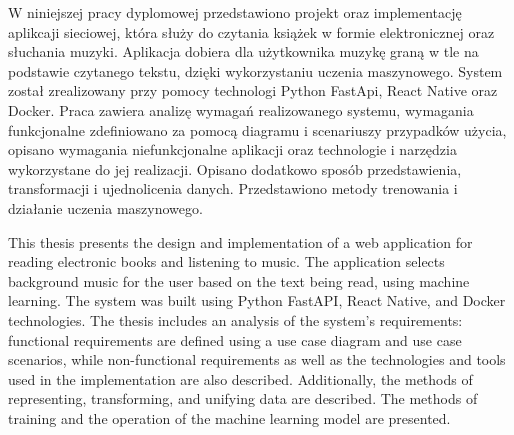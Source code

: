 
\begin{abstracts}
  \AbstractPL
W niniejszej pracy dyplomowej przedstawiono projekt oraz implementację aplikcaji sieciowej, która służy do czytania książek w formie elektronicznej oraz słuchania muzyki. Aplikacja dobiera dla użytkownika muzykę graną w tle na podstawie czytanego tekstu, dzięki wykorzystaniu uczenia maszynowego. System został zrealizowany przy pomocy technologi Python FastApi, React Native oraz Docker. Praca zawiera analizę wymagań realizowanego systemu, wymagania funkcjonalne zdefiniowano za pomocą diagramu i scenariuszy przypadków użycia, opisano wymagania niefunkcjonalne aplikacji oraz technologie i narzędzia wykorzystane do jej realizacji. Opisano dodatkowo sposób przedstawienia, transformacji i ujednolicenia danych. Przedstawiono metody trenowania i działanie uczenia maszynowego.
		
	\AbstractENG
This thesis presents the design and implementation of a web application for reading electronic books and listening to music. The application selects background music for the user based on the text being read, using machine learning. The system was built using Python FastAPI, React Native, and Docker technologies. The thesis includes an analysis of the system's requirements: functional requirements are defined using a use case diagram and use case scenarios, while non-functional requirements as well as the technologies and tools used in the implementation are also described. Additionally, the methods of representing, transforming, and unifying data are described. The methods of training and the operation of the machine learning model are presented.
\end{abstracts}

